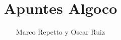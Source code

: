 \documentclass{article}
\title{Apuntes Algoco}
\author{Marco Repetto y Oscar Ruiz}
\date{}
\begin{document}
\maketitle
\vspace*{\fill} %
\newpage
\tableofcontents







\end{document}
